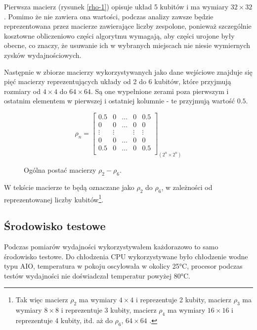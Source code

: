 \documentclass[11pt, a4paper]{article}
\begin{document}
\begin{sloppypar}
    \FloatBarrier

    Pierwsza macierz (rysunek \ref{rho-1}) opisuje układ 5 kubitów i ma wymiary
    $32\times32$. Pomimo że nie zawiera ona wartości, podczas analizy zawsze będzie
    reprezentowana przez macierze zawierające liczby zespolone, ponieważ szczególnie kosztowne
    obliczeniowo części algorytmu wymagają, aby części urojone były obecne, co znaczy,
    że usuwanie ich w wybranych miejscach nie niesie wymiernych zysków wydajnościowych.

    Następnie w zbiorze macierzy wykorzystywanych jako dane wejściowe znajduje się pięć
    macierzy reprezentujących układy od 2 do 6 kubitów, które przyjmują rozmiary od $4\times
    4$ do $64\times64$. Są one wypełnione zerami poza pierwszym i ostatnim elementem w
    pierwszej i ostatniej kolumnie - te przyjmują wartość $0.5$.

    \FloatBarrier
    \begin{figure}[ht]
      \centering
      \setcounter{MaxMatrixCols}{33}
      \[
        \rho_{n}=
        \begin{bmatrix}
          0.5    & 0      & \hdots & 0      & 0.5    \\
          0      & 0      & \hdots & 0      & 0      \\
          \vdots & \vdots &        & \vdots & \vdots \\
          0      & 0      & \hdots & 0      & 0      \\
          0.5    & 0      & \hdots & 0      & 0.5    \\
        \end{bmatrix}_{(2^{n}\times2^{n})}
      \]
      \caption{Ogólna postać macierzy $\rho_{2}- \rho_{6}$.}
      \label{rho-2-6}
    \end{figure}

    \FloatBarrier

    W tekście macierze te będą oznaczane jako $\rho_{2}$ do $\rho_{6}$, w zależności od reprezentowanej
    liczby kubitów\footnote{Tak więc macierz $\rho_{2}$ ma wymiary $4\times 4$ i
    reprezentuje 2 kubity, macierz $\rho_{3}$ ma wymiary $8\times8$ i reprezentuje 3 kubity,
    macierz $\rho_{4}$ ma wymiary $16\times16$ i reprezentuje 4 kubity, itd. aż do
    $\rho_{6}$, $64\times64$ .}.

    \subsection{Środowisko testowe}
    Podczas pomiarów wydajności wykorzystywałem każdorazowo to samo środowisko testowe. Do
    chłodzenia CPU wykorzystywane było chłodzenie wodne typu AIO, temperatura w pokoju
    oscylowała w okolicy 25°C, procesor podczas testów wydajności nie doświadczał temperatur
    powyżej 80°C.


\end{sloppypar}
\end{document}
